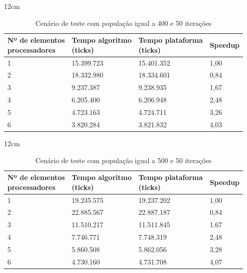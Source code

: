 \begin{table}[h]{12cm}
    \caption{Cenário de teste com população igual a 400 e 50 iterações}
    \label{cenario19}
    \begin{tabular}{llll}
        \hline
        \shortstack[l]{Nº de elementos \\ processadores} & \shortstack[l]{Tempo algoritmo \\ (ticks)} & \shortstack[l]{Tempo plataforma \\ (ticks)} & Speedup \\
        \hline
        1 & 15.399.723 & 15.401.352 & 1,00 \\
        2 & 18.332.980 & 18.334.601 & 0,84 \\
        3 & 9.237.387  & 9.238.935  & 1,67 \\
        4 & 6.205.400  & 6.206.948  & 2,48 \\
        5 & 4.723.163  & 4.724.711  & 3,26 \\
        6 & 3.820.284  & 3.821.832  & 4,03 \\
        \hline
    \end{tabular}
\end{table}

\begin{table}[h]{12cm}
    \caption{Cenário de teste com população igual a 500 e 50 iterações}
    \label{cenario20}
    \begin{tabular}{llll}
        \hline
        \shortstack[l]{Nº de elementos \\ processadores} & \shortstack[l]{Tempo algoritmo \\ (ticks)} & \shortstack[l]{Tempo plataforma \\ (ticks)} & Speedup \\
        \hline
        1 & 19.235.575 & 19.237.202 & 1,00 \\
        2 & 22.885.567 & 22.887.187 & 0,84 \\
        3 & 11.510.217 & 11.511.845 & 1,67 \\
        4 & 7.746.771  & 7.748.319  & 2,48 \\
        5 & 5.860.508  & 5.862.056  & 3,28 \\
        6 & 4.730.160  & 4.731.708  & 4,07 \\
        \hline
    \end{tabular}
\end{table}

